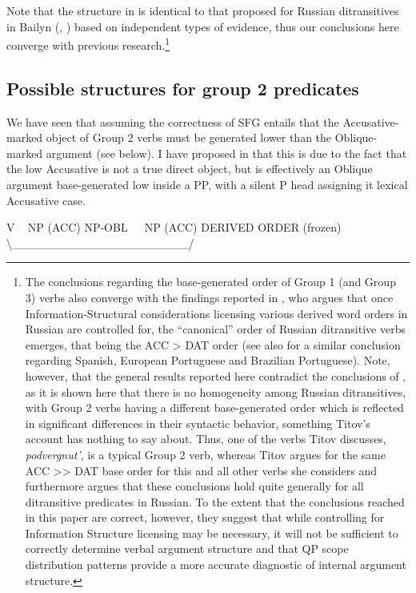 \documentclass[output=paper,colorlinks,citecolor=brown,modfonts,nonflat]{langsci/langscibook}
\begin{document}
Note that the structure in  is identical to that proposed for Russian ditransitives in Bailyn (\citeyear{Bailyn1995}, \citeyear{Bailyn2012}) based on independent types of evidence, thus our conclusions here converge with previous research.\footnote{The conclusions regarding the base-generated order of Group 1 (and Group 3) verbs also converge with the findings reported in \citet{Titov2017}, who argues that once Information-Structural considerations licensing various derived word orders in Russian are controlled for, the “canonical” order of Russian ditransitive verbs emerges, that being the ACC > DAT order (see also  for a similar conclusion regarding Spanish, European Portuguese and Brazilian Portuguese). Note, however, that the general results reported here contradict the conclusions of \citet{Titov2017}, as it is shown here that there is no homogeneity among Russian ditransitives, with Group 2 verbs having a different base-generated order which is reflected in significant differences in their syntactic behavior, something Titov’s account has nothing to say about. Thus, one of the verbs Titov discusses, \textit{podvergnut’}, is a typical Group 2 verb, whereas Titov argues for the same ACC >> DAT base order for this and all other verbs she considers and furthermore argues that these conclusions hold quite generally for all ditransitive predicates in Russian. To the extent that the conclusions reached in this paper are correct, however, they suggest that while controlling for Information Structure licensing may be necessary, it will not be sufficient to correctly determine verbal argument structure and that QP scope distribution patterns provide a more accurate diagnostic of internal argument structure.}

\subsection{Possible structures for group 2 predicates}\label{sec:antonyuk:4.2}

We have seen that assuming the correctness of SFG entails that the Accusative-marked object of Group 2 verbs must be generated lower than the Oblique-marked argument (see  below). I have proposed in \citet{Antonyuk2015} that this is due to the fact that the low Accusative is not a true direct object, but is effectively an Oblique argument base-generated low inside a PP, with a silent P head assigning it lexical Accusative case.

\ea%
    \label{ex:antonyuk:49}
    V ~ NP (ACC) NP-OBL~~~NP (ACC)  DERIVED ORDER (frozen)  ~                               {\textbackslash}\_\_\_\_\_\_\_\_\_\_\_\_\_\_\_\_\_\_\_\_\_/
    \z
\end{document}
